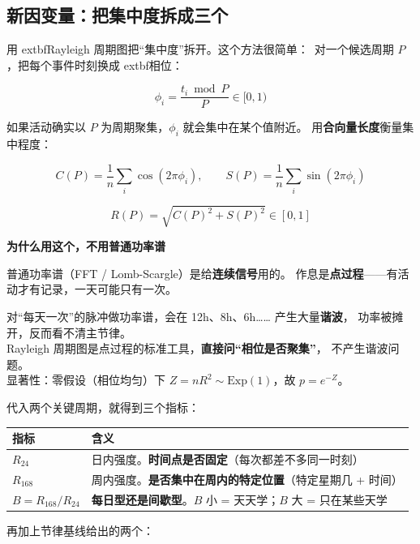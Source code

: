 \documentclass[UTF8,a4paper,11pt]{ctexart}
\newenvironment{explainbox}[1]
{\begin{center}\begin{minipage}{0.94\textwidth}\colorbox{boxbg}{\parbox{0.92\textwidth}{\textbf{#1}\par\vspace{2pt}}}}
{\end{minipage}\end{center}}
\begin{document}
\subsection{新因变量：把集中度拆成三个}

用 	extbf{Rayleigh 周期图}把“集中度”拆开。这个方法很简单：\
对一个候选周期 $P$，把每个事件时刻换成	extbf{相位}：

\begin{equation}
\phi_i = \frac{t_i \bmod P}{P} \in [0, 1)
\end{equation}

如果活动确实以 $P$ 为周期聚集，$\phi_i$ 就会集中在某个值附近。
用\textbf{合向量长度}衡量集中程度：

\begin{equation}
C(P) = \frac{1}{n}\sum_i \cos(2\pi\phi_i), \qquad
S(P) = \frac{1}{n}\sum_i \sin(2\pi\phi_i)
\end{equation}

\begin{equation}
R(P) = \sqrt{C(P)^2 + S(P)^2} \in [0, 1]
\end{equation}

\begin{explainbox}{为什么用这个，不用普通功率谱}
普通功率谱（FFT / Lomb-Scargle）是给\textbf{连续信号}用的。
作息是\textbf{点过程}——有活动才有记录，一天可能只有一次。

对“每天一次”的脉冲做功率谱，会在 12h、8h、6h…… 产生大量\textbf{谐波}，
功率被摊开，反而看不清主节律。\\[4pt]
Rayleigh 周期图是点过程的标准工具，\textbf{直接问“相位是否聚集”}，
不产生谐波问题。\\[4pt]
显著性：零假设（相位均匀）下 $Z = nR^2 \sim \text{Exp}(1)$，故 $p = e^{-Z}$。
\end{explainbox}

代入两个关键周期，就得到三个指标：

\begin{longtable}{@{}p{2.6cm}p{11.2cm}@{}}
\toprule
\textbf{指标} & \textbf{含义} \\
\midrule
$R_{24}$ & 日内强度。\textbf{时间点是否固定}（每次都差不多同一时刻） \\
$R_{168}$ & 周内强度。\textbf{是否集中在周内的特定位置}（特定星期几 + 时间） \\
$B = R_{168}/R_{24}$ & \textbf{每日型还是间歇型}。$B$ 小 = 天天学；$B$ 大 = 只在某些天学 \\
\bottomrule
\end{longtable}

再加上节律基线给出的两个：
\end{document}

